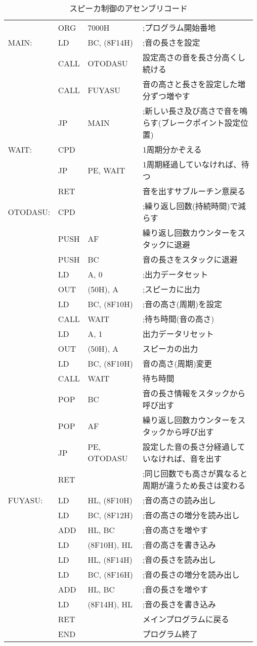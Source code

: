 \documentclass[11pt,a4j]{jsarticle}
\begin{document}
   \begin{table}[htb]
  \begin{center}
    \caption{スピーカ制御のアセンブリコード}
    \begin{tabular}{|llll|} \hline
 &ORG  & 7000H & ;プログラム開始番地 \\
MAIN: &LD  & BC, (8F14H) & ;音の長さを設定 \\
 & CALL &OTODASU  & 設定高さの音を長さ分高くし続ける \\
 & CALL & FUYASU & 音の高さと長さを設定した増分ずつ増やす \\
 &JP  &MAIN  & ;新しい長さ及び高さで音を鳴らす(ブレークポイント設定位置) \\
WAIT: &CPD  &  & 1周期分かぞえる \\
 & JP &PE, WAIT  &  1周期経過していなければ、待つ\\
 & RET &  & 音を出すサブルーチン意戻る \\
OTODASU: &CPD  &  & ;繰り返し回数(持続時間)で減らす \\
 & PUSH &AF  & 繰り返し回数カウンターをスタックに退避 \\
 & PUSH & BC & 音の長さをスタックに退避 \\
 & LD & A, 0 & ;出力データセット \\
 & OUT & (50H), A & ;スピーカに出力 \\
 &LD  &BC, (8F10H)  & ;音の高さ(周期)を設定 \\
 &CALL  &WAIT  & ;待ち時間(音の高さ) \\
 & LD & A, 1 & 出力データリセット \\
 & OUT & (50H), A & スピーカの出力 \\
 & LD & BC, (8F10H) & 音の高さ(周期)変更 \\
 & CALL & WAIT & 待ち時間 \\
 & POP & BC & 音の長さ情報をスタックから呼び出す \\
 &POP  & AF & 繰り返し回数カウンターをスタックから呼び出す \\
 &JP  & PE, OTODASU & 設定した音の長さ分経過していなければ、音を出す \\
 & RET &  & ;同じ回数でも高さが異なると周期が違うため長さは変わる \\
FUYASU: & LD & HL, (8F10H) & ;音の高さの読み出し \\
 & LD & BC, (8F12H) & ;音の高さの増分を読み出し \\
 & ADD & HL, BC & ;音の高さを増やす \\
 & LD & (8F10H), HL & ;音の高さを書き込み \\
 & LD & HL, (8F14H) & ;音の長さを読み出し \\
 & LD & BC, (8F16H) & ;音の長さの増分を読み出し \\
 & ADD & HL, BC & ;音の長さを増やす \\
 & LD & (8F14H), HL & ;音の長さを書き込み \\
 & RET &  & メインプログラムに戻る \\
 & END &  & プログラム終了 \\ \hline
    \end{tabular}
    \label{tab:tejun3-2}
  \end{center}
 \end{table}
   
\end{document}
